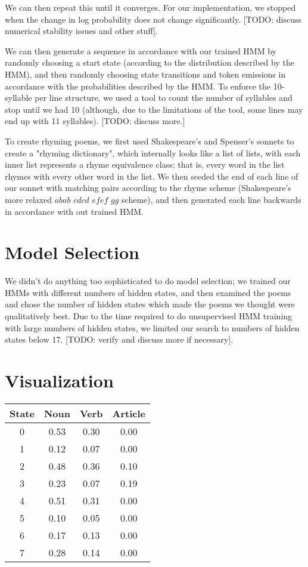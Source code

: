 We can then repeat this until it converges. For our implementation, we stopped when the change in log probability does not change significantly. [TODO: discuss numerical stability issues and other stuff].
\par We can then generate a sequence in accordance with our trained HMM by randomly choosing a start state (according to the distribution described by the HMM), and then randomly choosing state transitions and token emissions in accordance with the probabilities described by the HMM. To enforce the 10-syllable per line structure, we used a tool to count the number of syllables and stop until we had 10 (although, due to the limitations of the tool, some lines may end up with 11 syllables). [TODO: discuss more.]
\par To create rhyming poems, we first used Shakespeare's and Spenser's sonnets to create a "rhyming dictionary", which internally looks like a list of lists, with each inner list represents a rhyme equivalence class; that is, every word in the list rhymes with every other word in the list. We then seeded the end of each line of our sonnet with matching pairs according to the rhyme scheme (Shakespeare's more relaxed $abab$ $cdcd$ $efef$ $gg$ scheme), and then generated each line backwards in accordance with out trained HMM.

\section{Model Selection}
We didn't do anything too sophisticated to do model selection; we trained our HMMs with different numbers of hidden states, and then examined the poems and chose the number of hidden states which made the poems we thought were qualitatively best. Due to the time required to do unsupervised HMM training with large numbers of hidden states, we limited our search to numbers of hidden states below 17. [TODO: verify and discuss more if necessary].

\section{Visualization}
\begin{tabular}{|c|c|c|c|}
\hline 
State & Noun & Verb & Article \\ 
\hline 
0 & 0.53 & 0.30 & 0.00 \\ 
\hline 
1 & 0.12 & 0.07 & 0.00 \\ 
\hline 
2 & 0.48 & 0.36 & 0.10 \\ 
\hline 
3 & 0.23 & 0.07 & 0.19 \\ 
\hline 
4 & 0.51 & 0.31 & 0.00 \\ 
\hline 
5 & 0.10 & 0.05 & 0.00 \\ 
\hline 
6 & 0.17 & 0.13 & 0.00 \\ 
\hline 
7 & 0.28 & 0.14 & 0.00 \\ 
\hline 
\end{tabular} 

